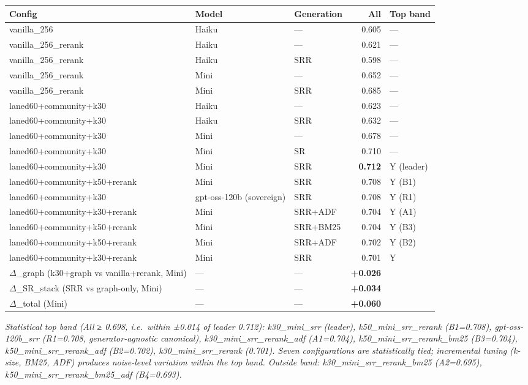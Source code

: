 \documentclass[
]{article}
\begin{document}
\begin{small}
\setlength{\tabcolsep}{4pt}
\begin{longtable}{p{2.2in}p{1.3in}p{0.7in}rp{0.8in}}
\toprule
\textbf{Config} & \textbf{Model} & \textbf{Generation} & \textbf{All} & \textbf{Top band} \\
\midrule
\endhead
vanilla\_256 & Haiku & — & 0.605 & — \\
vanilla\_256\_rerank & Haiku & — & 0.621 & — \\
vanilla\_256\_rerank & Haiku & SRR & 0.598 & — \\
vanilla\_256\_rerank & Mini & — & 0.652 & — \\
vanilla\_256\_rerank & Mini & SRR & 0.685 & — \\
laned60+community+k30 & Haiku & — & 0.623 & — \\
laned60+community+k30 & Haiku & SRR & 0.632 & — \\
laned60+community+k30 & Mini & — & 0.678 & — \\
laned60+community+k30 & Mini & SR & 0.710 & — \\
laned60+community+k30 & Mini & SRR & \textbf{0.712} & Y (leader) \\
laned60+community+k50+rerank & Mini & SRR & 0.708 & Y (B1) \\
laned60+community+k30 & gpt-oss-120b (sovereign) & SRR & 0.708 & Y (R1) \\
laned60+community+k30+rerank & Mini & SRR+ADF & 0.704 & Y (A1) \\
laned60+community+k50+rerank & Mini & SRR+BM25 & 0.704 & Y (B3) \\
laned60+community+k50+rerank & Mini & SRR+ADF & 0.702 & Y (B2) \\
laned60+community+k30+rerank & Mini & SRR & 0.701 & Y \\
\midrule
$\Delta$\_graph (k30+graph vs vanilla+rerank, Mini) & — & — & \textbf{+0.026} & \\
$\Delta$\_SR\_stack (SRR vs graph-only, Mini) & — & — & \textbf{+0.034} & \\
$\Delta$\_total (Mini) & — & — & \textbf{+0.060} & \\
\bottomrule
\end{longtable}
\end{small}

\emph{Statistical top band (All ≥ 0.698, i.e.~within ±0.014 of leader
0.712): k30\_mini\_srr (leader), k50\_mini\_srr\_rerank (B1=0.708),
gpt-oss-120b\_srr (R1=0.708, generator-agnostic canonical),
k30\_mini\_srr\_rerank\_adf (A1=0.704), k50\_mini\_srr\_rerank\_bm25
(B3=0.704), k50\_mini\_srr\_rerank\_adf (B2=0.702),
k30\_mini\_srr\_rerank (0.701). Seven configurations are statistically
tied; incremental tuning (k-size, BM25, ADF) produces noise-level
variation within the top band. Outside band:
k30\_mini\_srr\_rerank\_bm25 (A2=0.695),
k50\_mini\_srr\_rerank\_bm25\_adf (B4=0.693).}
\end{document}
